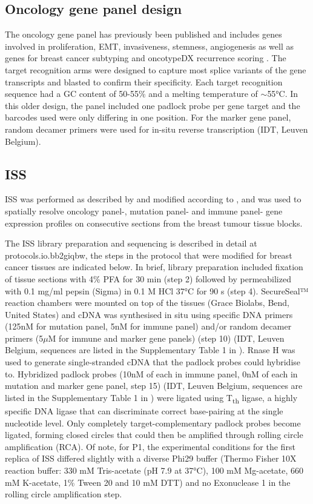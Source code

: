 \subsection{Oncology gene panel design}
\label{sec:protocol-suppl-expression-panel}

The oncology gene panel has previously been published and includes genes involved in proliferation, EMT, invasiveness, stemness, angiogenesis as well as genes for breast cancer subtyping and oncotypeDX recurrence scoring \parencite{Svedlund2019-xb}. The target recognition arms were designed to capture most splice variants of the gene transcripts and blasted to confirm their specificity. Each target recognition sequence had a GC content of 50-55\% and a melting temperature of $\sim$55°C. In this older design, the panel included one padlock probe per gene target and the barcodes used were only differing in one position. For the marker gene panel, random decamer primers were used for in-situ reverse transcription (IDT, Leuven Belgium).

\subsection{\acl{ISS}}

ISS was performed as described by \textcite{Ke2013-ux} and modified according to \textcite{Svedlund2019-xb}, and was used to spatially resolve oncology panel-, mutation panel- and immune panel- gene expression profiles on consecutive sections from the breast tumour tissue blocks. 

The \ac{ISS} library preparation and sequencing is described in detail at protocols.io.bb2giqbw, the steps in the protocol that were modified for breast cancer tissues are indicated below. In brief, library preparation included fixation of tissue sections with 4\% PFA for 30 min (step 2) followed by permeabilized with 0.1 mg/ml pepsin (Sigma) in 0.1 M HCl 37°C for 90 s (step 4). SecureSeal™ reaction chambers were mounted on top of the tissues (Grace Biolabs, Bend, United States) and cDNA was synthesised in situ using specific DNA primers (125nM for mutation panel, 5nM for immune panel) and/or random decamer primers (5$\mu$M for immune and marker gene panels) (step 10) (IDT, Leuven Belgium, sequences are listed in the Supplementary Table 1 in \textcite{Lomakin2022-ks}). Rnase H was used to generate single-stranded cDNA that the padlock probes could hybridise to. Hybridized padlock probes (10nM of each in immune panel, 0nM of each in mutation and marker gene panel, step 15) (IDT, Leuven Belgium, sequences are listed in the Supplementary Table 1 in \textcite{Lomakin2022-ks}) were ligated using T\textsubscript{th} ligase, a highly specific DNA ligase that can discriminate correct base-pairing at the single nucleotide level. Only completely target-complementary padlock probes become ligated, forming closed circles that could then be amplified through rolling circle amplification (RCA). Of note, for P1, the experimental conditions for the first replica of \ac{ISS} differed slightly with a diverse Phi29 buffer (Thermo Fisher 10X reaction buffer: 330 mM Tris-acetate (pH 7.9 at 37°C), 100 mM Mg-acetate, 660 mM K-acetate, 1\% Tween 20 and 10 mM DTT) and no Exonuclease 1 in the rolling circle amplification step.

